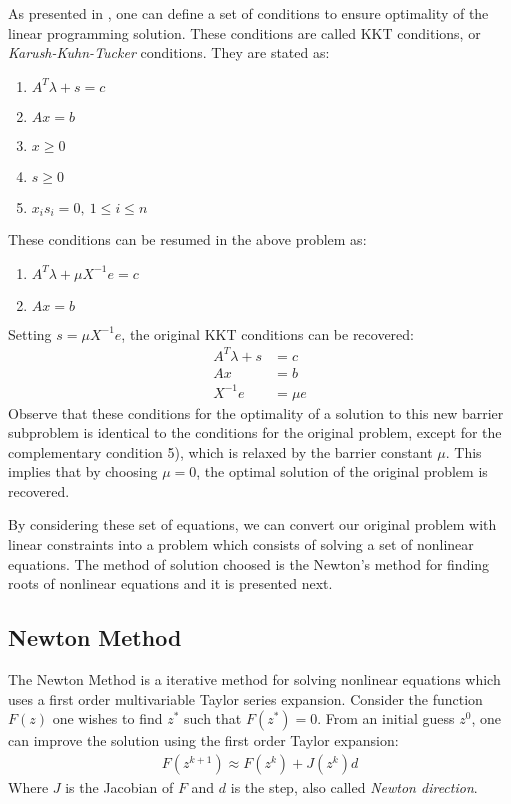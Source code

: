 \documentclass[a4paper]{IEEEtran}
\begin{document}
As presented in \cite{torontointerior}, one can define a set of conditions to ensure optimality of the linear programming solution. These conditions are called KKT conditions, or \emph{Karush-Kuhn-Tucker} conditions. They are stated as:
%
\begin{enumerate}
\item $A^{T}\lambda + s = c$	
\item $Ax = b$
\item $x \geq 0$
\item $s \geq 0$
\item $x_i s_i = 0, ~1 \leq i \leq n$
\end{enumerate}
These conditions can be resumed in the above problem as:
\begin{enumerate}
\item $A^{T}\lambda + \mu X^{-1} e = c$	
\item $Ax = b$
\end{enumerate}
Setting $s=\mu X^{-1} e$, the original KKT conditions can be recovered:
\begin{align}
	A^{T}\lambda + s &= c\\
	Ax &= b\\
	X^{-1} e &= \mu e
\end{align}
Observe that these conditions for the optimality of a solution to this new barrier subproblem is identical to the conditions for the original problem, except for the complementary condition 5), which is relaxed by the barrier constant $\mu$. This implies that by choosing $\mu = 0$, the optimal solution of the original problem is recovered.

By considering these set of equations, we can convert our original problem with linear constraints into a problem which consists of solving a set of nonlinear equations. The method of solution choosed is the Newton's method for finding roots of nonlinear equations and it is presented next. 

\subsection{Newton Method}
The Newton Method is a iterative method for solving nonlinear equations which uses a first order multivariable Taylor series expansion. Consider the function $F(z)$ one wishes to find $z^*$ such that $F(z^*) = 0$. From an initial guess $z^0$, one can improve the solution using the first order Taylor expansion:
\begin{align}
	F(z^{k+1}) \approx F(z^k) + J(z^k)d
\end{align} 
Where $J$ is the Jacobian of $F$ and $d$ is the step, also called \emph{Newton direction}. 
\end{document}
